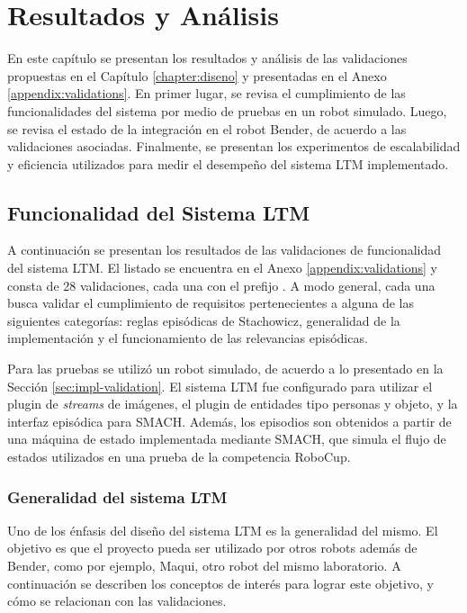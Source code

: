 \chapter{Resultados y Análisis}\label{chapter:results}
\newcommand\graphwidth{0.65}

En este capítulo se presentan los resultados y análisis de las validaciones propuestas en el Capítulo \ref{chapter:diseno} y presentadas en el Anexo \ref{appendix:validations}. En primer lugar, se revisa el cumplimiento de las funcionalidades del sistema por medio de pruebas en un robot simulado. Luego, se revisa el estado de la integración en el robot Bender, de acuerdo a las validaciones asociadas. Finalmente, se presentan los experimentos de escalabilidad y eficiencia utilizados para medir el desempeño del sistema LTM implementado.


\section{Funcionalidad del Sistema LTM}

A continuación se presentan los resultados de las validaciones de funcionalidad del sistema LTM. El listado se encuentra en el Anexo \ref{appendix:validations} y consta de 28 validaciones, cada una con el prefijo . A modo general, cada una busca validar el cumplimiento de requisitos pertenecientes a alguna de las siguientes categorías: reglas episódicas de Stachowicz, generalidad de la implementación y el funcionamiento de las relevancias episódicas.

Para las pruebas se utilizó un robot simulado, de acuerdo a lo presentado en la Sección \ref{sec:impl-validation}. El sistema LTM fue configurado para utilizar el plugin de \textit{streams} de imágenes, el plugin de entidades tipo personas y objeto, y la interfaz episódica para SMACH. Además, los episodios son obtenidos a partir de una máquina de estado implementada mediante SMACH, que simula el flujo de estados utilizados en una prueba de la competencia RoboCup.

\subsection{Generalidad del sistema LTM}

Uno de los énfasis del diseño del sistema LTM es la generalidad del mismo. El objetivo es que el proyecto pueda ser utilizado por otros robots además de Bender, como por ejemplo, Maqui, otro robot del mismo laboratorio. A continuación se describen los conceptos de interés para lograr este objetivo, y cómo se relacionan con las validaciones.

